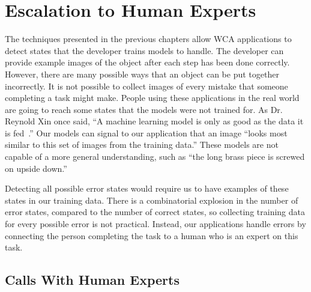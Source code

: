 \chapter{Escalation to Human Experts}\label{chap:escalation}

The techniques presented in the previous chapters allow WCA applications to
detect states that the developer trains models to handle.
The developer can provide example images of the object after each step has been
done correctly.
However, there are many possible ways that an object can be put together
incorrectly.
It is not possible to collect images of every mistake that someone completing a
task might make.
People using these
applications in the real world are going to reach some states that the models
were not trained for. As Dr. Reynold Xin once said,
``A machine learning model is only as good as the data it is fed~\cite{xin}.''
Our models can signal to our application that an image ``looks most similar to
this set of images from the training data.''
These models are not capable of a more general understanding, such as ``the long
brass piece is screwed on upside down.''

Detecting all possible error states would require us to have examples of these
states in our training data. There is a combinatorial explosion in the number of
error states, compared to the number of correct states, so collecting training
data for every possible error is not practical.
Instead, our applications handle errors by connecting the person completing the
task to a human who is an expert on this task.



\section{Calls With Human Experts}

